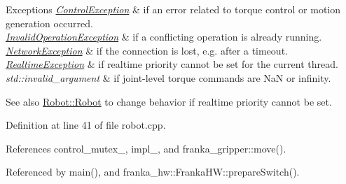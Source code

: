 \begin{DoxyExceptions}{Exceptions}
{\em \hyperlink{structfranka_1_1ControlException}{Control\+Exception}} & if an error related to torque control or motion generation occurred. \\
\hline
{\em \hyperlink{structfranka_1_1InvalidOperationException}{Invalid\+Operation\+Exception}} & if a conflicting operation is already running. \\
\hline
{\em \hyperlink{structfranka_1_1NetworkException}{Network\+Exception}} & if the connection is lost, e.\+g. after a timeout. \\
\hline
{\em \hyperlink{structfranka_1_1RealtimeException}{Realtime\+Exception}} & if realtime priority cannot be set for the current thread. \\
\hline
{\em std\+::invalid\+\_\+argument} & if joint-\/level torque commands are NaN or infinity.\\
\hline
\end{DoxyExceptions}
\begin{DoxySeeAlso}{See also}
\hyperlink{classfranka_1_1Robot_ae63bc19390df3d54f3a270814df35eb6}{Robot\+::\+Robot} to change behavior if realtime priority cannot be set. 
\end{DoxySeeAlso}


Definition at line 41 of file robot.\+cpp.



References control\+\_\+mutex\+\_\+, impl\+\_\+, and franka\+\_\+gripper\+::move().



Referenced by main(), and franka\+\_\+hw\+::\+Franka\+H\+W\+::prepare\+Switch().


